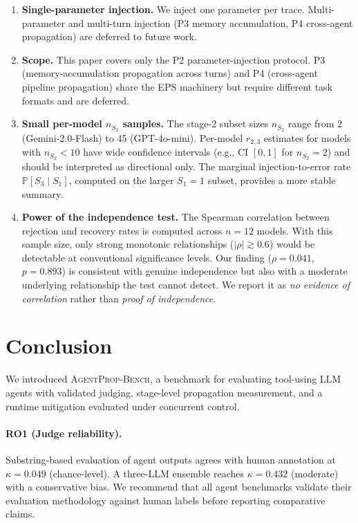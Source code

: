 \documentclass{ieeeaccess}
\newcommand{\bench}{\textsc{AgentProp-Bench}\xspace}
\renewcommand{\Pr}{\mathbb{P}}
\begin{document}
\begin{enumerate}
  \item \textbf{Single-parameter injection.}
    We inject one parameter per trace.
    Multi-parameter and multi-turn injection (P3 memory accumulation,
    P4 cross-agent propagation) are deferred to future work.

  \item \textbf{Scope.}
    This paper covers only the P2 parameter-injection protocol.
    P3 (memory-accumulation propagation across turns) and P4
    (cross-agent pipeline propagation) share the EPS machinery but
    require different task formats and are deferred.

  \item \textbf{Small per-model $n_{S_2}$ samples.}
    The stage-2 subset sizes $n_{S_2}$ range from 2 (Gemini-2.0-Flash)
    to 45 (GPT-4o-mini).
    Per-model $r_{2,3}$ estimates for models with $n_{S_2} < 10$ have
    wide confidence intervals (e.g., CI $[0, 1]$ for $n_{S_2}{=}2$)
    and should be interpreted as directional only.
    The marginal injection-to-error rate $\Pr[S_3 \mid S_1]$, computed
    on the larger $S_1{=}1$ subset, provides a more stable summary.

  \item \textbf{Power of the independence test.}
    The Spearman correlation between rejection and recovery rates is
    computed across $n{=}12$ models.
    With this sample size, only strong monotonic relationships
    ($|\rho| \gtrsim 0.6$) would be detectable at conventional significance
    levels.
    Our finding ($\rho{=}0.041$, $p{=}0.893$) is consistent with
    genuine independence but also with a moderate underlying relationship
    the test cannot detect.
    We report it as \emph{no evidence of correlation} rather than
    \emph{proof of independence}.
\end{enumerate}


\section{Conclusion}
\label{sec:conclusion}

We introduced \bench{}, a benchmark for evaluating tool-using LLM agents
with validated judging, stage-level propagation measurement, and a
runtime mitigation evaluated under concurrent control.

\paragraph{RO1 (Judge reliability).}
Substring-based evaluation of agent outputs agrees with human annotation
at $\kappa{=}0.049$ (chance-level).
A three-LLM ensemble reaches $\kappa{=}0.432$ (moderate) with a
conservative bias.
We recommend that all agent benchmarks validate their evaluation
methodology against human labels before reporting comparative claims.
\end{document}
